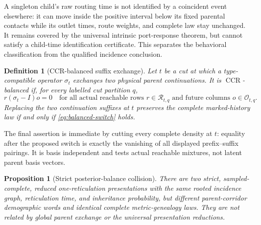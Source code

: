 \documentclass[11pt]{article}
\newtheorem{proposition}[theorem]{Proposition}
\newtheorem{definition}[theorem]{Definition}
\newcommand{\CCR}{\operatorname{CCR}}
\newcommand{\cR}{\mathcal R}
\newcommand{\cO}{\mathcal O}
\begin{document}
A singleton child's raw routing time is not identified by a coincident event elsewhere: it can move inside the positive interval below its fixed parental contacts while its outlet times, route weights, and complete law stay unchanged.  It remains covered by the universal intrinsic port-response theorem, but cannot satisfy a child-time identification certificate.  This separates the behavioral classification from the qualified incidence conclusion.

\begin{definition}[CCR-balanced suffix exchange]
Let $t$ be a cut at which a type-compatible operator $\sigma_t$ exchanges two physical parent continuations.  It is \emph{$\CCR$-balanced} if, for every labelled cut partition $q$,
\begin{equation}
r(\sigma_t-I)o=0
\quad\text{for all actual reachable rows }r\in\cR_{t,q}
\text{ and future columns }o\in\cO_{t,q}.
\label{eq:balanced-switch}
\end{equation}
Replacing the two continuation suffixes at $t$ preserves the complete marked-history law if and only if \eqref{eq:balanced-switch} holds.
\end{definition}

The final assertion is immediate by cutting every complete density at $t$: equality after the proposed switch is exactly the vanishing of all displayed prefix--suffix pairings.  It is basis independent and tests actual reachable mixtures, not latent parent basis vectors.

\begin{proposition}[Strict posterior-balance collision]
\label{prop:balance-switch}
There are two strict, sampled-complete, reduced one-reticulation presentations with the same rooted incidence graph, reticulation time, and inheritance probability, but different parent-corridor demographic words and identical complete metric-genealogy laws.  They are not related by global parent exchange or the universal presentation reductions.
\end{proposition}
\end{document}
